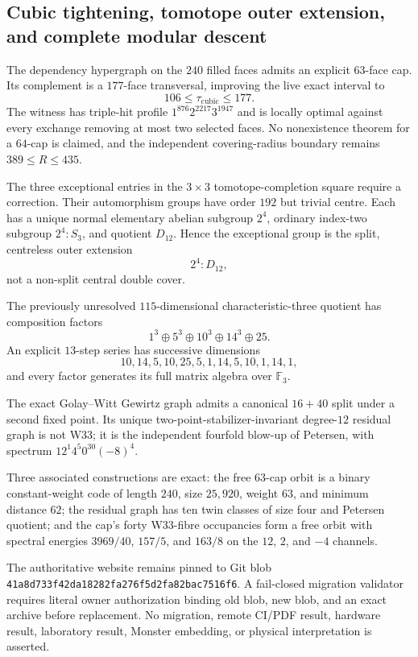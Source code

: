 \subsection{Cubic tightening, tomotope outer extension, and complete modular descent}
\label{sec:bt3871-3886}

The dependency hypergraph on the $240$ filled faces admits an explicit $63$-face cap. Its complement is a $177$-face transversal, improving the live exact interval to
\[
106\leq \tau_{\mathrm{cubic}}\leq177.
\]
The witness has triple-hit profile $1^{876}2^{2217}3^{1947}$ and is locally optimal against every exchange removing at most two selected faces. No nonexistence theorem for a $64$-cap is claimed, and the independent covering-radius boundary remains $389\leq R\leq435$.

The three exceptional entries in the $3\times3$ tomotope-completion square require a correction. Their automorphism groups have order $192$ but trivial centre. Each has a unique normal elementary abelian subgroup $2^4$, ordinary index-two subgroup $2^4\!:\!S_3$, and quotient $D_{12}$. Hence the exceptional group is the split, centreless outer extension
\[
2^4\!:\!D_{12},
\]
not a non-split central double cover.

The previously unresolved $115$-dimensional characteristic-three quotient has composition factors
\[
1^3\oplus5^3\oplus10^3\oplus14^3\oplus25.
\]
An explicit $13$-step series has successive dimensions
\[
10,14,5,10,25,5,1,14,5,10,1,14,1,
\]
and every factor generates its full matrix algebra over $\mathbb F_3$.

The exact Golay--Witt Gewirtz graph admits a canonical $16+40$ split under a second fixed point. Its unique two-point-stabilizer-invariant degree-$12$ residual graph is not W33; it is the independent fourfold blow-up of Petersen, with spectrum $12^1 4^5 0^{30}(-8)^4$.

Three associated constructions are exact: the free $63$-cap orbit is a binary constant-weight code of length $240$, size $25{,}920$, weight $63$, and minimum distance $62$; the residual graph has ten twin classes of size four and Petersen quotient; and the cap's forty W33-fibre occupancies form a free orbit with spectral energies $3969/40$, $157/5$, and $163/8$ on the $12$, $2$, and $-4$ channels.

The authoritative website remains pinned to Git blob \texttt{41a8d733f42da18282fa276f5d2fa82bac7516f6}. A fail-closed migration validator requires literal owner authorization binding old blob, new blob, and an exact archive before replacement. No migration, remote CI/PDF result, hardware result, laboratory result, Monster embedding, or physical interpretation is asserted.
